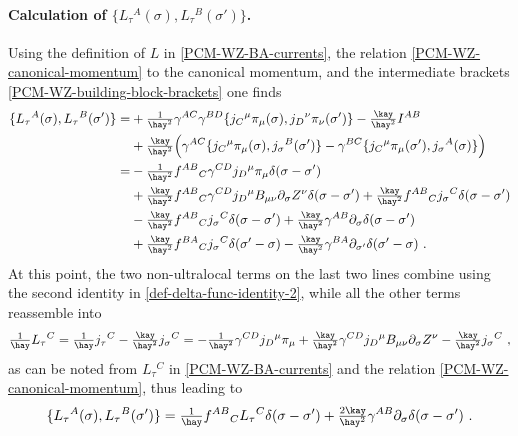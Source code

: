 \documentclass[12pt]{article}
\numberwithin{equation}{section}
\begin{document}
\paragraph{Calculation of $\{L_{\tau}{}^{A}(\sigma),L_{\tau}{}^{B}(\sigma')\}$.} Using the definition of $L$ in \eqref{PCM-WZ-BA-currents}, the relation \eqref{PCM-WZ-canonical-momentum} to the canonical momentum, and the intermediate brackets \eqref{PCM-WZ-building-block-brackets} one finds
\begin{align}
\{L_{\tau}{}^{A}(\sigma),L_{\tau}{}^{B}(\sigma')\} =&+\tfrac{1}{\hay^2}\gamma^{AC}\gamma^{BD}\{j_{C}{}^{\mu}\pi_{\mu}(\sigma),j_{D}{}^{\nu}\pi_{\nu}(\sigma')\}-\tfrac{\kay}{\hay^2}I^{AB}
\notag\\
&+\tfrac{\kay}{\hay^2}\Bigl( \gamma^{AC}\{j_{C}{}^{\mu}\pi_{\mu}(\sigma),j_{\sigma}{}^{B}(\sigma')\}-\gamma^{BC}\{j_{C}{}^{\mu}\pi_{\mu}(\sigma'),j_{\sigma}{}^{A}(\sigma)\} \Bigr)
\notag\\
=&-\tfrac{1}{\hay^2}f^{AB}{}_{C}\gamma^{CD}j_{D}{}^{\mu}\pi_{\mu}\delta(\sigma-\sigma')
\notag\\
&+\tfrac{\kay}{\hay^2}f^{AB}{}_{C}\gamma^{CD}j_{D}{}^{\mu}B_{\mu\nu}\partial_{\sigma}Z^{\nu}\delta(\sigma-\sigma')+\tfrac{\kay}{\hay^2}f^{AB}{}_{C}j_{\sigma}{}^{C}\delta(\sigma-\sigma')
\notag\\
&-\tfrac{\kay}{\hay^2}f^{AB}{}_{C}j_{\sigma}{}^{C}\delta(\sigma-\sigma')+\tfrac{\kay}{\hay^2}\gamma^{AB}\partial_{\sigma}\delta(\sigma-\sigma')
\notag\\
&+\tfrac{\kay}{\hay^2}f^{BA}{}_{C}j_{\sigma}{}^{C}\delta(\sigma'-\sigma)-\tfrac{\kay}{\hay^2}\gamma^{BA}\partial_{\sigma'}\delta(\sigma'-\sigma) \,\, .
\end{align}
At this point, the two non-ultralocal terms on the last two lines combine using the second identity in \eqref{def-delta-func-identity-2}, while all the other terms reassemble into
\begin{equation}
\tfrac{1}{\hay}L_{\tau}{}^{C}=\tfrac{1}{\hay}j_{\tau}{}^{C}-\tfrac{\kay}{\hay^2}j_{\sigma}{}^{C}=-\tfrac{1}{\hay^2}\gamma^{CD}j_{D}{}^{\mu}\pi_{\mu}+\tfrac{\kay}{\hay^2}\gamma^{CD}j_{D}{}^{\mu}B_{\mu\nu}\partial_{\sigma}Z^{\nu}-\tfrac{\kay}{\hay^2}j_{\sigma}{}^{C} \,\, ,
\end{equation}
as can be noted from $L_{\tau}{}^{C}$ in \eqref{PCM-WZ-BA-currents} and the relation \eqref{PCM-WZ-canonical-momentum}, thus leading to
\begin{equation}
\{L_{\tau}{}^{A}(\sigma),L_{\tau}{}^{B}(\sigma')\} = \tfrac{1}{\hay}f^{AB}{}_{C}L_{\tau}{}^{C}\delta(\sigma-\sigma')+\tfrac{2\kay}{\hay^2}\gamma^{AB}\partial_{\sigma}\delta(\sigma-\sigma') \,\, .
\end{equation}
\end{document}
